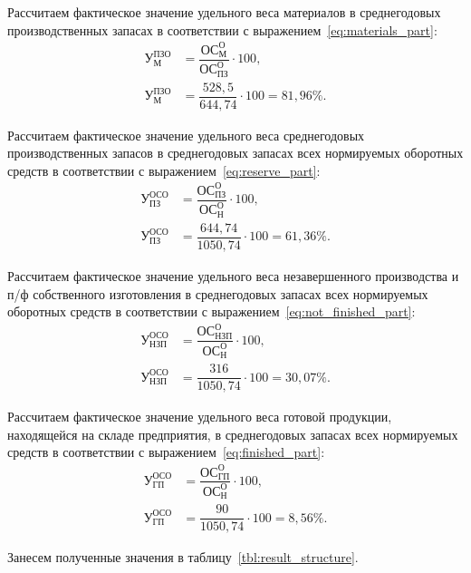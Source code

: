 Рассчитаем фактическое значение удельного веса материалов в среднегодовых
производственных запасах в соответствии с выражением~\ref{eq:materials_part}:
\begin{align}
\label{eq:materials_part}
\text{У}^\text{ПЗО}_\text{М} &=
  \dfrac{\text{ОС}^\text{О}_\text{М}}{\text{ОС}^\text{О}_\text{ПЗ}} \cdot 100, \\
\text{У}^\text{ПЗО}_\text{М} &=
  \dfrac{528{,}5}{644{,}74} \cdot 100 = 81{,}96 \%. \nonumber
\end{align}

Рассчитаем фактическое значение удельного веса среднегодовых производственных
запасов в среднегодовых запасах всех нормируемых оборотных средств 
в соответствии с выражением~\ref{eq:reserve_part}:
\begin{align}
\label{eq:reserve_part}
\text{У}^\text{ОСО}_\text{ПЗ} &=
  \dfrac{\text{ОС}^\text{О}_\text{ПЗ}}{\text{ОС}^\text{О}_\text{Н}} \cdot 100, \\
\text{У}^\text{ОСО}_\text{ПЗ} &=
  \dfrac{644{,}74}{1050{,}74} \cdot 100 = 61{,}36 \%. \nonumber
\end{align}

Рассчитаем фактическое значение удельного веса незавершенного производства и 
п/ф собственного изготовления в среднегодовых запасах всех нормируемых оборотных средств в соответствии с выражением~\ref{eq:not_finished_part}:
\begin{align}
\label{eq:not_finished_part}
\text{У}^\text{ОСО}_\text{НЗП} &=
  \dfrac{\text{ОС}^\text{О}_\text{НЗП}}{\text{ОС}^\text{О}_\text{Н}} \cdot 100, \\
\text{У}^\text{ОСО}_\text{НЗП} &=
  \dfrac{316}{1050{,}74} \cdot 100 = 30{,}07 \%. \nonumber
\end{align}

Рассчитаем фактическое значение удельного веса готовой продукции,
находящейся на складе предприятия, в среднегодовых запасах всех нормируемых
средств в соответствии с выражением~\ref{eq:finished_part}:
\begin{align}
\label{eq:finished_part}
\text{У}^\text{ОСО}_\text{ГП} &=
  \dfrac{\text{ОС}^\text{О}_\text{ГП}}{\text{ОС}^\text{О}_\text{Н}} \cdot 100, \\
\text{У}^\text{ОСО}_\text{ГП} &=
  \dfrac{90}{1050{,}74} \cdot 100  = 8{,}56 \%. \nonumber
\end{align}

Занесем полученные значения в таблицу~\ref{tbl:result_structure}.

